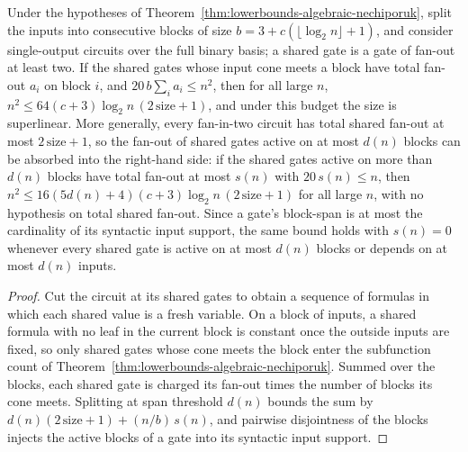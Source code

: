 \begin{theorem}
  \label{thm:lowerbounds-algebraic-nechiporuk-blockspan}
  \leanok
  Under the hypotheses of Theorem~\ref{thm:lowerbounds-algebraic-nechiporuk},
  split the inputs into consecutive blocks of size
  $b = 3 + c(\lfloor\log_2 n\rfloor + 1)$, and consider single-output circuits
  over the full binary basis; a shared gate is a gate of fan-out at least two.
  If the shared gates whose input cone meets a block have total fan-out
  $a_i$ on block $i$, and $20\,b\sum_i a_i \le n^2$, then for all large $n$,
  $n^2 \le 64(c+3)\log_2 n\,(2\,\mathrm{size} + 1)$, and under this budget the
  size is superlinear. More generally, every fan-in-two circuit has total
  shared fan-out at most $2\,\mathrm{size} + 1$, so the fan-out of shared gates
  active on at most $d(n)$ blocks can be absorbed into the right-hand side: if
  the shared gates active on more than $d(n)$ blocks have total fan-out at most
  $s(n)$ with $20\,s(n) \le n$, then
  $n^2 \le 16(5 d(n) + 4)(c+3)\log_2 n\,(2\,\mathrm{size} + 1)$ for all large
  $n$, with no hypothesis on total shared fan-out. Since a gate's block-span is
  at most the cardinality of its syntactic input support, the same bound holds
  with $s(n) = 0$ whenever every shared gate is active on at most $d(n)$ blocks
  or depends on at most $d(n)$ inputs.
\end{theorem}
\begin{proof}
  \leanok
  Cut the circuit at its shared gates to obtain a sequence of formulas in
  which each shared value is a fresh variable. On a block of inputs, a shared
  formula with no leaf in the current block is constant once the outside
  inputs are fixed, so only shared gates whose cone meets the block enter the
  subfunction count of Theorem~\ref{thm:lowerbounds-algebraic-nechiporuk}.
  Summed over the blocks, each shared gate is charged its fan-out times the
  number of blocks its cone meets. Splitting at span threshold $d(n)$ bounds
  the sum by $d(n)(2\,\mathrm{size} + 1) + (n/b)\,s(n)$, and pairwise
  disjointness of the blocks injects the active blocks of a gate into its
  syntactic input support.
\end{proof}

